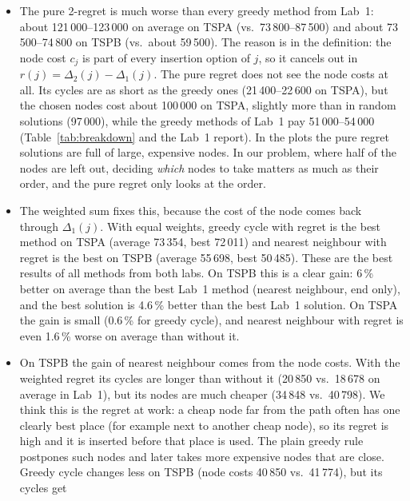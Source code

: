 \documentclass[11pt,a4paper]{article}
\begin{document}
\begin{itemize}
  \item The pure 2-regret is much worse than every greedy method from Lab~1:
        about 121\,000--123\,000 on average on TSPA (vs.\ 73\,800--87\,500) and
        about 73\,500--74\,800 on TSPB (vs.\ about 59\,500). The reason is in
        the definition: the node cost $c_j$ is part of every insertion option
        of $j$, so it cancels out in $r(j) = \Delta_2(j) - \Delta_1(j)$. The
        pure regret does not see the node costs at all. Its cycles are as
        short as the greedy ones (21\,400--22\,600 on TSPA), but the chosen
        nodes cost about 100\,000 on TSPA, slightly more than in random
        solutions (97\,000), while the greedy methods of Lab~1 pay
        51\,000--54\,000 (Table~\ref{tab:breakdown} and the Lab~1 report). In the plots the pure regret solutions
        are full of large, expensive nodes. In our problem, where half of the
        nodes are left out, deciding \emph{which} nodes to take matters as much
        as their order, and the pure regret only looks at the order.
  \item The weighted sum fixes this, because the cost of the node comes back
        through $\Delta_1(j)$. With equal weights, greedy cycle with regret is
        the best method on TSPA (average 73\,354, best 72\,011) and nearest
        neighbour with regret is the best on TSPB (average 55\,698, best
        50\,485). These are the best results of all methods from both labs. On
        TSPB this is a clear gain: 6\,\% better on average than the best Lab~1
        method (nearest neighbour, end only), and the best solution is 4.6\,\% better than the
        best Lab~1 solution. On TSPA the gain is small (0.6\,\% for greedy cycle),
        and nearest neighbour with regret is even 1.6\,\% worse on average than
        without it.
  \item On TSPB the gain of nearest neighbour comes from the node costs. With
        the weighted regret its cycles are longer than without it (20\,850
        vs.\ 18\,678 on average in Lab~1), but its nodes are much cheaper
        (34\,848 vs.\ 40\,798). We think this is the regret at work: a cheap node far
        from the path often has one clearly best place (for example next to
        another cheap node), so its regret is high and it is inserted before
        that place is used. The plain greedy rule postpones such nodes and
        later takes more expensive nodes that are close. Greedy cycle changes
        less on TSPB (node costs 40\,850 vs.\ 41\,774), but its cycles get

\end{itemize}
\end{document}
